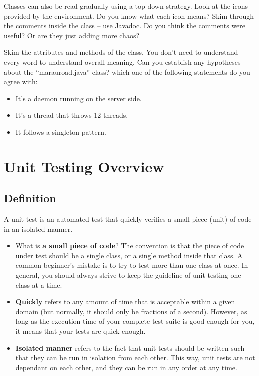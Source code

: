 \documentclass[
]{book}
\providecommand{\tightlist}{%
  \setlength{\itemsep}{0pt}\setlength{\parskip}{0pt}}
\begin{document}
Classes can also be read gradually using a top-down strategy. Look at the icons provided by the environment. Do you know what each icon means? Skim through the comments inside the class -- use Javadoc. Do you think the comments were useful? Or are they just adding more chaos?

Skim the attributes and methods of the class. You don't need to understand every word to understand overall meaning. Can you establish any hypotheses about the ``marauroad.java'' class? which one of the following statements do you agree with:

\begin{itemize}
\tightlist
\item
  It's a daemon running on the server side.
\item
  It's a thread that throws 12 threads.
\item
  It follows a singleton pattern.
\end{itemize}

\hypertarget{unit-testing-overview}{%
\section{Unit Testing Overview}\label{unit-testing-overview}}

\hypertarget{definition}{%
\subsection{Definition}\label{definition}}

A unit test is an automated test that quickly verifies a small piece (unit) of code in an isolated manner.

\begin{itemize}
\tightlist
\item
  What is \textbf{a small piece of code}? The convention is that the piece of code under test should be a single class, or a single method inside that class. A common beginner's mistake is to try to test more than one class at once. In general, you should always strive to keep the guideline of unit testing one class at a time.
\item
  \textbf{Quickly} refers to any amount of time that is acceptable within a given domain (but normally, it should only be fractions of a second). However, as long as the execution time of your complete test suite is good enough for you, it means that your tests are quick enough.
\item
  \textbf{Isolated manner} refers to the fact that unit tests should be written such that they can be run in isolation from each other. This way, unit tests are not dependant on each other, and they can be run in any order at any time.
\end{itemize}
\end{document}
